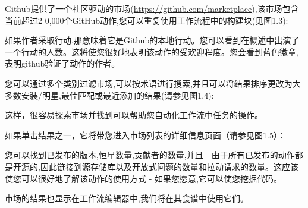 Github提供了一个社区驱动的市场(\url{https://github.com/marketplace}),该市场包含当前超过2 0,000个GitHub动作,您可以重复使用工作流程中的构建块(见图1.3):


如果作者采取行动,那意味着它是Github的本地行动。您可以看到在概述中出演了一个行动的人数。这将使您很好地表明该动作的受欢迎程度。您会看到蓝色徽章,表明github验证了动作的作者。

您可以通过多个类别过滤市场,可以按术语进行搜索,并且可以将结果排序更改为大多数安装/明星,最佳匹配或最近添加的结果(请参见图1.4):


这样，很容易探索市场并找到可以帮助您自动化工作流中任务的操作。

如果单击结果之一，它将带您进入市场列表的详细信息页面（请参见图1.5）：


您可以找到已发布的版本,恒星数量,贡献者的数量,并且 - 由于所有已发布的动作都是开源的,因此链接到源存储库以及开放式问题的数量和拉动请求的数量。这应该使您可以很好地了解该动作的使用方式 - 如果您愿意,它可以使您挖掘代码。

市场的结果也显示在工作流编辑器中,我们将在其食谱中使用它们。














